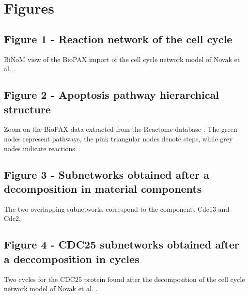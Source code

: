 \documentclass[10pt]{bmc_article}
\newenvironment{bmcformat}{\baselineskip20pt\sloppy\setboolean{publ}{false}}{\baselineskip20pt\sloppy}
\begin{document}
\begin{bmcformat}
\newpage
{
   }     %





\section*{Figures}
  \subsection*{Figure 1 - Reaction network of the cell cycle}
      BiNoM view of the BioPAX import of the cell cycle network model of Novak
et al. \cite{novak1998model}.

  \subsection*{Figure 2 - Apoptosis pathway hierarchical structure}
      Zoom on the BioPAX data extracted from the Reactome database \cite{joshi2005reactome}.
The green nodes represent pathways, the pink triangular nodes denote steps,
while grey nodes indicate reactions.

   \subsection*{Figure 3 - Subnetworks obtained after a decomposition in
material components}
      The two overlapping subnetworks correspond to the components Cdc13 and
Cdc2. 

   \subsection*{Figure 4 - CDC25 subnetworks obtained after a deccomposition in
cycles}
      Two cycles for the CDC25 protein found after the decomposition of the cell
cycle network model of Novak et al. \cite{novak1998model}.


\end{bmcformat}
\end{document}
